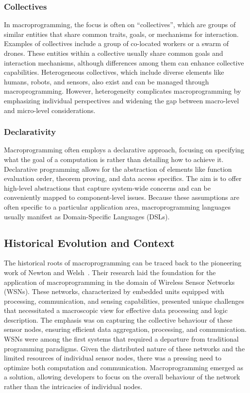 \subsubsection*{Collectives}
In macroprogramming, 
 the focus is often on ``collectives'', 
 which are groups of similar entities that share common traits, goals, or mechanisms for interaction. Examples of collectives include a group of co-located workers or a swarm of drones. 
 These entities within a collective usually share common goals and interaction mechanisms, 
 although differences among them can enhance collective capabilities. 
 Heterogeneous collectives, which include diverse elements like humans, robots, and sensors, also exist and can be managed through macroprogramming. 
 However, heterogeneity complicates macroprogramming by emphasizing individual perspectives and widening the gap between macro-level and micro-level considerations.

\subsubsection*{Declarativity}
Macroprogramming often employs a declarative approach, 
 focusing on specifying what the goal of a computation is rather than detailing how to achieve it.
 Declarative programming allows for the abstraction of elements like function evaluation order, 
  theorem proving, and data access specifics. 
  The aim is to offer high-level abstractions that capture system-wide concerns and can be conveniently mapped to component-level issues. 
  Because these assumptions are often specific to a particular application area, macroprogramming languages usually manifest as Domain-Specific Languages (DSLs).
\subsection{Historical Evolution and Context}
The historical roots of macroprogramming can be traced back to the pioneering work of Newton and Welsh~\cite{newton2004region}. 
 Their research laid the foundation for the application of macroprogramming in the domain of Wireless Sensor Networks (WSNs). 
 These networks, characterized by embedded units equipped with processing, communication, and sensing capabilities, presented unique challenges that necessitated a macroscopic view for effective data processing and logic description. 
The emphasis was on capturing the collective behaviour of these sensor nodes, 
 ensuring efficient data aggregation, processing, and communication.
%
WSNs were among the first systems that required a departure from traditional programming paradigms. 
 Given the distributed nature of these networks and the limited resources of individual sensor nodes, 
 there was a pressing need to optimize both computation and communication. 
 Macroprogramming emerged as a solution, 
 allowing developers to focus on the overall behaviour of the network rather than the intricacies of individual nodes.

